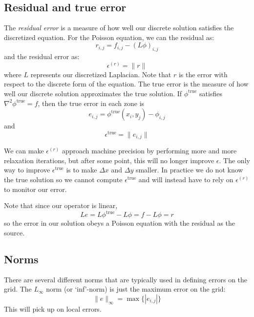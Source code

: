 \subsection{Residual and true error}

The {\em residual error} is a measure of how well our discrete solution
satisfies the discretized equation.  For the Poisson equation, we
can the residual as:
\begin{equation}
r_{i,j} = f_{i,j} - (L \phi)_{i,j} 
\end{equation}
and the residual error as:
\begin{equation}
\epsilon^{(r)} = \| r \|
\end{equation}
where $L$ represents our discretized Laplacian.  Note that $r$ is the
error with respect to the discrete form of the equation.  The true
error is the measure of how well our discrete solution approximates
the true solution.  If $\phi^\mathrm{true}$ satisfies $\nabla^2
\phi^\mathrm{true} = f$, then the true error in each zone is
\begin{equation}
e_{i,j} = \phi^\mathrm{true}(x_i,y_j) - \phi_{i,j} 
\end{equation}
and
\begin{equation}
\epsilon^\mathrm{true} = \| e_{i,j} \|
\end{equation}

We can make $\epsilon^{(r)}$ approach machine precision by performing
more and more relaxation iterations, but after some point, this will
no longer improve $\epsilon$.  The only way to improve
$\epsilon^\mathrm{true}$ is to make $\Delta x$ and $\Delta y$ smaller.
In practice we do not know the true solution so we cannot compute
$\epsilon^\mathrm{true}$ and will instead have to rely on
$\epsilon^{(r)}$ to monitor our error.

Note that since our operator is linear,
\begin{equation}
L e = L\phi^\mathrm{true} - L\phi = f - L\phi = r
\end{equation}
so the error in our solution obeys a Poisson equation with the residual
as the source.

\subsection{Norms}

There are several different norms that are typically used in defining
errors on the grid.  The $L_\infty$ norm (or `inf'-norm) is just the
maximum error on the grid:
\begin{equation}
\|e\|_\infty = \max \{ |e_{i,j}| \}
\end{equation}
This will pick up on local errors.  

